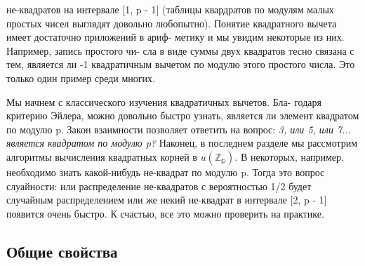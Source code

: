 \documentclass{../template/mai_book}
\begin{document}
\noindent не-квадратов на интервале [1, p - 1] (таблицы квардратов по модулям \linebreak малых простых чисел выглядят довольно любопытно). \linebreak
\indent Понятие квадратного вычета имеет достаточно приложений в ариф- \linebreak метику и мы увидим некоторые из них. Например, запись простого чи- \linebreak сла в виде суммы двух квадратов тесно связана с тем, является ли -1 \linebreak квадратичным вычетом по модулю этого простого числа. Это только \linebreak один пример среди многих. \par 
\indent Мы начнем с классического изучения квадратичных вычетов. Бла- \linebreak годаря критерию Эйлера, можно довольно быстро узнать, является ли \linebreak элемент квадратом по модулю p. Закон взаимности позволяет ответить \linebreak на вопрос: \textit{3, или 5, или 7... является квадратом по модулю p?} Наконец, в последнем разделе мы рассмотрим алгоритмы вычисления \linebreak квадратных корней в $u(\mathbb{Z_{p}})$. В некоторых, например, необходимо знать \linebreak какой-нибудь не-квадрат по модулю p. Тогда это вопрос слуайности: \linebreak или распределение не-квадратов с вероятностью 1/2 будет случайным \linebreak распределением или же некий не-квадрат в интервале [2, p - 1] появится \linebreak очень быстро. К счастью, все это можно проверить на практике. \par 

\subsection{Общие свойства}
 
\end{document}
